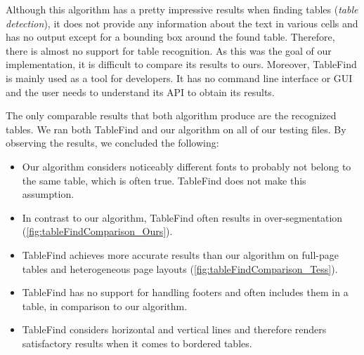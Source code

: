 Although this algorithm has a pretty impressive results when finding tables (\emph{table detection}), it does not provide any information about the text in various cells and has no output except for a bounding box around the found table. Therefore, there is almost no support for table recognition. As this was the goal of our implementation, it is difficult to compare its results to ours. Moreover, TableFind is mainly used as a tool for developers. It has no command line interface or GUI and the user needs to understand its API to obtain its results.

The only comparable results that both algorithm produce are the recognized tables. We ran both TableFind and our algorithm on all of our testing files. By observing the results, we concluded the following:
\begin{itemize}
    \item Our algorithm considers noticeably different fonts to probably not belong to the same table, which is often true. TableFind does not make this assumption.
    \item In contrast to our algorithm, TableFind often results in over-segmentation (\cref{fig:tableFindComparison_Ours}).
    \item TableFind achieves more accurate results than our algorithm on full-page tables and heterogeneous page layouts (\cref{fig:tableFindComparison_Tess}).
    \item TableFind has no support for handling footers and often includes them in a table, in comparison to our algorithm.
    \item TableFind considers horizontal and vertical lines and therefore renders satisfactory results when it comes to bordered tables.
\end{itemize}


